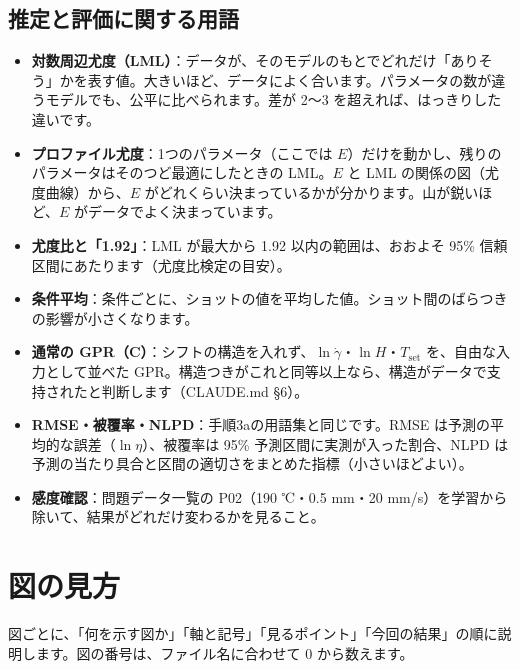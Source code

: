 \documentclass[paper=a4paper,fontsize=10.5pt,line_length=44zw,number_of_lines=38]{jlreq}
\newcommand{\gd}{\dot{\gamma}}
\newcommand{\Tset}{T_{\mathrm{set}}}
\newenvironment{termlist}{\begin{itemize}[label=・,leftmargin=1\zw,labelwidth=1\zw,labelsep=0pt,itemsep=0.4ex,topsep=0.6ex,parsep=0pt]}{\end{itemize}}
\newcommand{\term}[1]{\item \textbf{#1}：}
\begin{document}
\subsection{推定と評価に関する用語}
\begin{termlist}
\term{対数周辺尤度（LML）}データが、そのモデルのもとでどれだけ「ありそう」かを表す値。大きいほど、データによく合います。パラメータの数が違うモデルでも、公平に比べられます。差が 2〜3 を超えれば、はっきりした違いです。
\term{プロファイル尤度}1つのパラメータ（ここでは $E$）だけを動かし、残りのパラメータはそのつど最適にしたときの LML。$E$ と LML の関係の図（尤度曲線）から、$E$ がどれくらい決まっているかが分かります。山が鋭いほど、$E$ がデータでよく決まっています。
\term{尤度比と「1.92」}LML が最大から 1.92 以内の範囲は、おおよそ 95\% 信頼区間にあたります（尤度比検定の目安）。
\term{条件平均}条件ごとに、ショットの値を平均した値。ショット間のばらつきの影響が小さくなります。
\term{通常の GPR（C）}シフトの構造を入れず、$\ln\gd$・$\ln H$・$\Tset$ を、自由な入力として並べた GPR。構造つきがこれと同等以上なら、構造がデータで支持されたと判断します（CLAUDE.md §6）。
\term{RMSE・被覆率・NLPD}手順3aの用語集と同じです。RMSE は予測の平均的な誤差（$\ln\eta$）、被覆率は 95\% 予測区間に実測が入った割合、NLPD は予測の当たり具合と区間の適切さをまとめた指標（小さいほどよい）。
\term{感度確認}問題データ一覧の P02（190 ℃・0.5 mm・20 mm/s）を学習から除いて、結果がどれだけ変わるかを見ること。
\end{termlist}

\section{図の見方}

図ごとに、「何を示す図か」「軸と記号」「見るポイント」「今回の結果」の順に説明します。図の番号は、ファイル名に合わせて 0 から数えます。
\end{document}
